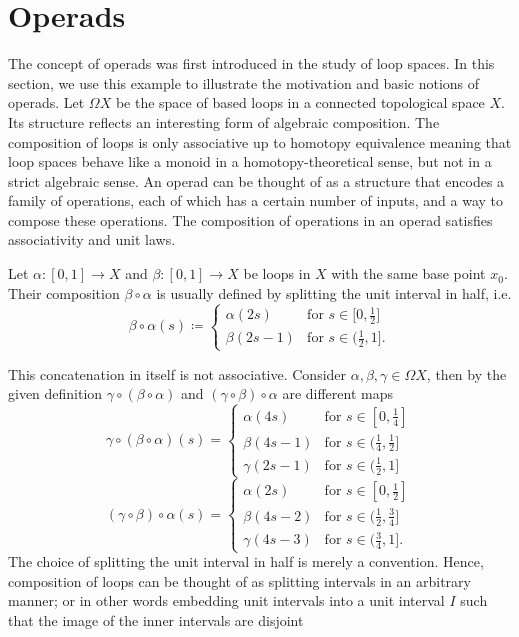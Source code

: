 
% 
\section{Operads}\label{sec:operads}
    The concept of operads was first introduced in the study of loop spaces. In
    this section, we use this example to illustrate the motivation and basic
    notions of operads. Let $\Omega X$ be the space of based loops in a
    connected topological space $X$. Its structure reflects an interesting form
    of algebraic composition. The composition of loops is only associative up to
    homotopy equivalence meaning that loop spaces behave like a monoid in a
    homotopy-theoretical sense, but not in a strict algebraic sense. An operad can
    be thought of as a structure that encodes a family of operations, each of
    which has a certain number of inputs, and a way to compose these operations.
    The composition of operations in an operad satisfies associativity and unit
    laws. 

    Let $\alpha \colon [0,1] \to X$ and $\beta\colon [0,1] \to X$ be loops in
    $X$ with the same base point $x_0$. Their composition $\beta \circ \alpha$
    is usually defined by splitting the unit interval in half, i.e.
    \[ \beta \circ \alpha (s) \coloneqq
        \begin{cases}
            \alpha(2s) & \text{for } s \in \big[0,\frac{1}{2}\big] \\
            \beta(2s-1) & \text{for } s \in \big(\frac{1}{2},1\big].
        \end{cases}
    \]

    This concatenation in itself is not associative. Consider $\alpha, \beta,
    \gamma \in \Omega X$, then by the given definition $\gamma \circ (\beta
    \circ \alpha)$ and $(\gamma \circ \beta) \circ \alpha$ are different maps
     \[ \gamma \circ (\beta \circ \alpha) (s) =
        \begin{cases}
            \alpha(4s) & \text{for } s \in \left[0,\frac{1}{4}\right] \\
            \beta(4s-1) & \text{for } s \in \big(\frac{1}{4}, \frac{1}{2}\big]
            \\
            \gamma(2s-1) & \text{for } s \in \big(\frac{1}{2}, 1\big]      
        \end{cases}
    \]
    \[ (\gamma \circ \beta) \circ \alpha (s) =
        \begin{cases}
            \alpha(2s) & \text{for } s \in \left[0,\frac{1}{2}\right] \\
            \beta(4s-2) & \text{for } s \in \big(\frac{1}{2}, \frac{3}{4}\big]
            \\
            \gamma(4s-3) & \text{for } s \in \big(\frac{3}{4}, 1\big].
        \end{cases}
    \] The choice of splitting the unit interval in half is merely a convention.
    Hence, composition of loops can be thought of as splitting intervals in an
    arbitrary manner; or in other words embedding unit intervals into a unit
    interval $I$ such that the image of the inner intervals are disjoint

